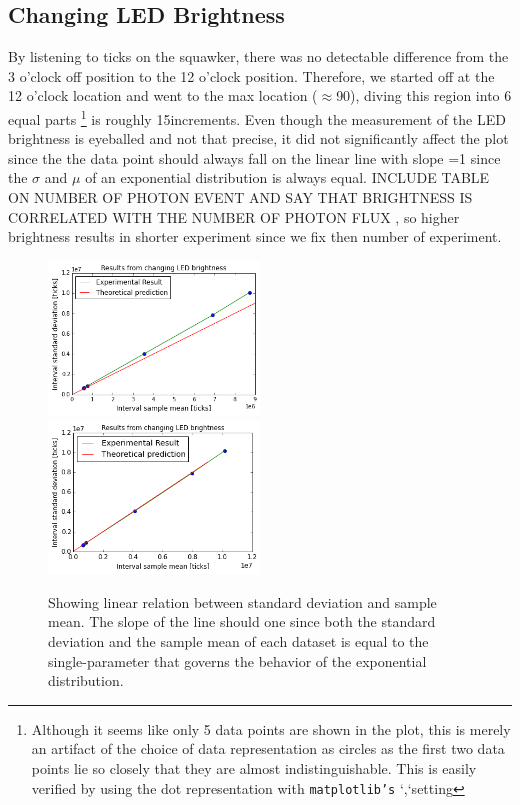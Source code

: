 \documentclass[authoryear, 12pt,5p, times]{elsarticle}
\begin{document}
   \subsection{Changing LED Brightness}
\indent By listening to ticks on the squawker, there was no detectable difference from the 3 o'clock off position to the 12 o'clock position. Therefore, we started off at the 12 o'clock location and went to the max location ($\approx$90\degree), diving this region into 6 equal parts \footnote{Although it seems like only 5 data points are shown in the plot, this is merely an artifact of the choice of data representation as circles as  the first two data points lie so closely that they are almost indistinguishable. This is easily verified by using the dot representation with \texttt{matplotlib's} `,`setting} is roughly 15\degree  increments. Even though the measurement of the LED brightness is eyeballed and not that precise, it did not significantly affect the plot since the the data point should always fall on the linear line with slope =1 since the $\sigma$ and $\mu$ of an exponential distribution is always equal.
INCLUDE TABLE ON NUMBER OF PHOTON EVENT AND SAY THAT BRIGHTNESS IS CORRELATED WITH THE NUMBER OF PHOTON FLUX , so higher brightness results in shorter  experiment since we fix then number of experiment.
\begin{figure}[h]
\centering
\includegraphics[width=0.5\textwidth]{figures/changeLED}
\includegraphics[width=0.5\textwidth]{figures/changeLED_gating}
\caption{Showing linear relation between standard deviation and sample mean. The slope of the line should one since both the standard deviation and the sample mean of each dataset is equal to the single-parameter that governs the behavior of the exponential distribution.}
\label{changeLED}
\end{figure}
\end{document}
